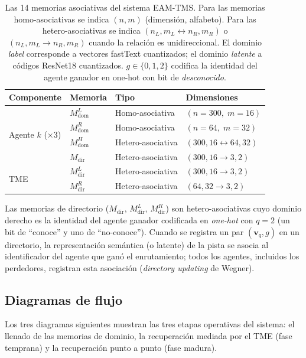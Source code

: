 \begin{table}[H]
\centering
\caption{Las 14 memorias asociativas del sistema EAM-TMS.
Para las memorias homo-asociativas se indica $(n, m)$ (dimensión, alfabeto).
Para las hetero-asociativas se indica $(n_L, m_L \leftrightarrow n_R, m_R)$ o
$(n_L, m_L \to n_R, m_R)$ cuando la relación es unidireccional.
El dominio \emph{label} corresponde a vectores fastText cuantizados;
el dominio \emph{latente} a códigos ResNet18 cuantizados.
$g \in \{0,1,2\}$ codifica la identidad del agente ganador en one-hot con bit de
\emph{desconocido}.}
\label{tab:memorias}
\small
\begin{tabular}{@{}llll@{}}
\toprule
\textbf{Componente} & \textbf{Memoria} & \textbf{Tipo} & \textbf{Dimensiones} \\
\midrule
\multirow{4}{*}{Agente $k$ (×3)} &
  $M^L_{\mathrm{dom}}$ & Homo-asociativa & $(n{=}300,\; m{=}16)$ \\
& $M^R_{\mathrm{dom}}$ & Homo-asociativa & $(n{=}64,\; m{=}32)$ \\
& $M^H_{\mathrm{dom}}$ & Hetero-asociativa & $(300, 16 \leftrightarrow 64, 32)$ \\
& $M_{\mathrm{dir}}$   & Hetero-asociativa & $(300, 16 \to 3, 2)$ \\
\midrule
\multirow{2}{*}{TME} &
  $M^L_{\mathrm{dir}}$ & Hetero-asociativa & $(300, 16 \to 3, 2)$ \\
& $M^R_{\mathrm{dir}}$ & Hetero-asociativa & $(64, 32 \to 3, 2)$ \\
\bottomrule
\end{tabular}
\end{table}

Las memorias de directorio ($M_{\mathrm{dir}}$, $M^L_{\mathrm{dir}}$,
$M^R_{\mathrm{dir}}$) son hetero-asociativas cuyo dominio derecho es la identidad del
agente ganador codificada en \emph{one-hot} con $q=2$ (un bit de ``conoce'' y uno de
``no-conoce'').
Cuando se registra un par $(\mathbf{v}_q, g)$ en un directorio, la representación
semántica (o latente) de la pista se asocia al identificador del agente que ganó el
enrutamiento; todos los agentes, incluidos los perdedores, registran esta asociación
(\emph{directory updating} de Wegner).

\subsection{Diagramas de flujo}
\label{sec:diagramas}

Los tres diagramas siguientes muestran las tres etapas operativas del sistema:
el llenado de las memorias de dominio, la recuperación mediada por el TME (fase temprana)
y la recuperación punto a punto (fase madura).

